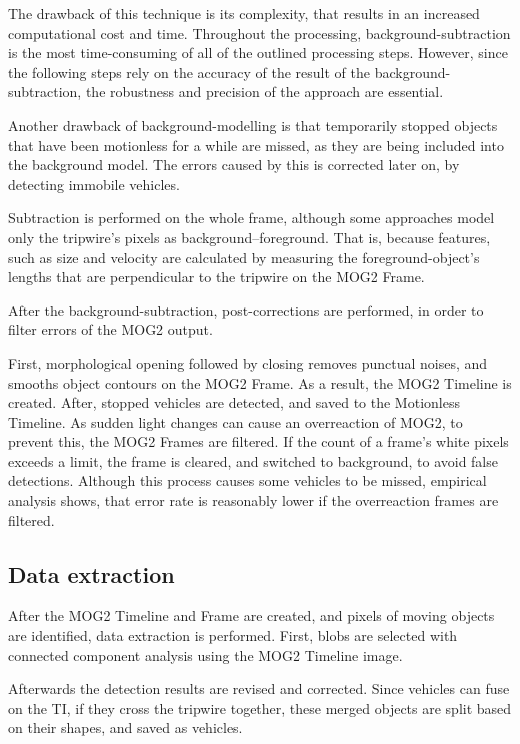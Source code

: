 The drawback of this technique is its complexity, that results in an increased computational cost and time.
Throughout the processing, background-subtraction is the most time-consuming of all of the outlined processing steps.
However, since the following steps rely on the accuracy of the result of the background-subtraction, the robustness and precision of the approach are essential.

Another drawback of background-modelling is that temporarily stopped objects that have been motionless for a while are missed, as they are being included into the background model.
The errors caused by this is corrected later on, by detecting immobile vehicles.

Subtraction is performed on the whole frame, although some approaches model only the tripwire's pixels as background--foreground.
That is, because features, such as size and velocity are calculated by measuring the foreground-object's lengths that are perpendicular to the tripwire on the MOG2 Frame.

After the background-subtraction, post-corrections are performed, in order to filter errors of the MOG2 output.

First, morphological opening followed by closing removes punctual noises, and smooths object contours on the MOG2 Frame.
As a result, the MOG2 Timeline is created.
After, stopped vehicles are detected, and saved to the Motionless Timeline.
As sudden light changes can cause an overreaction of MOG2, to prevent this, the MOG2 Frames are filtered.
If the count of a frame's white pixels exceeds a limit, the frame is cleared, and switched to background, to avoid false detections.
Although this process causes some vehicles to be missed, empirical analysis shows, that error rate is reasonably lower if the overreaction frames are filtered.
\subsection{Data extraction}
After the MOG2 Timeline and Frame are created, and pixels of moving objects are identified, data extraction is performed.
First, blobs are selected with connected component analysis using the MOG2 Timeline image.

Afterwards the detection results are revised and corrected.
Since vehicles can fuse on the TI, if they cross the tripwire together, these merged objects are split based on their shapes, and saved as vehicles.

